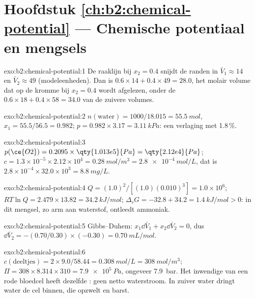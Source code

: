\section*{Hoofdstuk \ref{ch:b2:chemical-potential} --- Chemische potentiaal en mengsels}

\begin{solution}{exo:b2:chemical-potential:1}
De raaklijn bij $x_2 = 0.4$ snijdt de randen in $\bar V_1 \approx 14$ en $\bar
V_2 \approx 49$ (modeleenheden). Dan is $0.6 \times 14 + 0.4 \times 49 = 28.0$,
het molair volume dat op de kromme bij $x_2 = 0.4$ wordt afgelezen, onder de
$0.6 \times 18 + 0.4 \times 58 = 34.0$ van de zuivere volumes.
\end{solution}

\begin{solution}{exo:b2:chemical-potential:2}
$n(\text{water}) = 1000/18.015 = \qty{55.5}{mol}$, $x_1 = 55.5/56.5 = 0.982$;
$p = 0.982 \times 3.17 = \qty{3.11}{kPa}$: een verlaging met 1.8\,\%.
\end{solution}

\begin{solution}{exo:b2:chemical-potential:3}
$p(\ce{O2}) = 0.2095 \times \qty{1.013e5}{Pa} = \qty{2.12e4}{Pa}$;
$c = 1.3 \times 10^{-5} \times 2.12 \times 10^4 = \qty{0.28}{mol/m^3} =
\qty{2.8e-4}{mol/L}$, dat is $2.8 \times 10^{-4} \times 32.0 \times 10^3 =
\qty{8.8}{mg/L}$.
\end{solution}

\begin{solution}{exo:b2:chemical-potential:4}
$Q = (1.0)^2/[(1.0)(0.010)^3] = 1.0 \times 10^6$; $RT\ln Q = 2.479 \times 13.82 =
\qty{34.2}{kJ/mol}$; $\Delta_r G = -32.8 + 34.2 = \qty{+1.4}{kJ/mol} > 0$: in dit
mengsel, zo arm aan waterstof, ontleedt ammoniak.
\end{solution}

\begin{solution}{exo:b2:chemical-potential:5}
Gibbs--Duhem: $x_1\dd\bar V_1 + x_2\dd\bar V_2 = 0$, dus $\dd\bar V_2 =
-(0.70/0.30) \times (-0.30) = \qty{+0.70}{mL/mol}$.
\end{solution}

\begin{solution}{exo:b2:chemical-potential:6}
$c(\text{deeltjes}) = 2 \times 9.0/58.44 = \qty{0.308}{mol/L} =
\qty{308}{mol/m^3}$; $\Pi = 308 \times 8.314 \times 310 = \qty{7.9e5}{Pa}$,
ongeveer \qty{7.9}{bar}. Het inwendige van een rode bloedcel heeft dezelfde :
geen netto waterstroom. In zuiver water dringt water de cel binnen, die opzwelt en
barst.
\end{solution}

